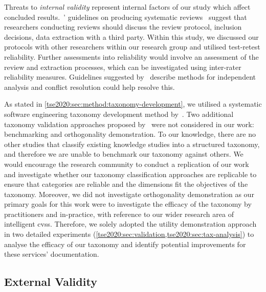 Threats to \textit{internal validity} represent internal factors of our study which affect concluded results.~\citeauthor{Kitchenham:2007dd}' guidelines on producing systematic reviews~\citep{Kitchenham:2007dd} suggest that researchers conducting reviews should discuss the review protocol, inclusion decisions, data extraction with a third party. Within this study, we discussed our protocols with other researchers within our research group and utilised test-retest reliability. Further assessments into reliability would involve an assessment of the review and extraction processes, which can be investigated using inter-rater reliability measures. Guidelines suggested by~\citet{Garousi:2017:EGE:3084226.3084238} describe methods for independent analysis and conflict resolution could help resolve this.

As stated in \cref{tse2020:sec:method:taxonomy-development}, we utilised a systematic software engineering taxonomy development method by~\citet{Usman:2017hn}. Two additional taxonomy validation approaches proposed by~\citeauthor{Usman:2017hn} were not considered in our work: benchmarking and orthogonality demonstration. To our knowledge, there are no other studies that classify existing  knowledge studies into a structured taxonomy, and therefore we are unable to benchmark our taxonomy against others. We would encourage the research community to conduct a replication of our work and investigate whether our taxonomy classification approaches are replicable to ensure that categories are reliable and the dimensions fit the objectives of the taxonomy. Moreover, we did not investigate orthogonality demonstration as our primary goals for this work were to investigate the efficacy of the taxonomy by practitioners and in-practice, with reference to our wider research area of intelligent \glspl{cvs}. Therefore, we solely adopted the utility demonstration approach in two detailed experiments (\cref{tse2020:sec:validation,tse2020:sec:tax-analysis}) to analyse the efficacy of our taxonomy and identify potential improvements for these services'  documentation.



\subsection{External Validity}

